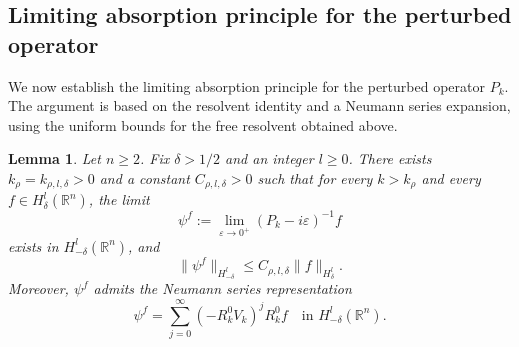 \documentclass[12pt,a4paper]{amsart}
\numberwithin{equation}{section}
\theoremstyle{plain}
\newtheorem{lemma}[theorem]{Lemma}
\theoremstyle{definition}
\begin{document}
\subsection{Limiting absorption principle for the perturbed operator}
We now establish the limiting absorption principle for the perturbed operator $P_k$.
The argument is based on the resolvent identity and a Neumann series expansion, using the uniform bounds for the free resolvent obtained above.
\begin{lemma}\label{lem_LAP}
Let $n \geq 2$. Fix $\delta >1/2$ and an integer $l \geq 0$. There exists $k_\rho = k_{\rho, l, \delta}>0$ and a constant $C_{ \rho,l, \delta}>0$ such that for every $k > k_\rho$ and every $f \in H^l_\delta(\mathbb{R}^n)$, the limit
\begin{equation}\label{eq:LAP_def}
\psi^f := \lim_{\varepsilon \to 0^+}(P_k - i\varepsilon)^{-1}f
\end{equation}
exists in $H^l_{-\delta}(\mathbb{R}^n)$, and %
\begin{equation}\label{eq:weighted_stability}
\|\psi^f\|_{H^l_{-\delta}} \leq C_{ \rho,l, \delta}\|f\|_{H^l_\delta}.
\end{equation}
Moreover, $\psi^f$ admits the Neumann series representation
\begin{equation}\label{eq:psi_equals_Nseries}
\psi^f
=
\sum_{j=0}^\infty
(-R_k^0 V_k)^j R_k^0 f
\quad\text{in } H^l_{-\delta}(\mathbb{R}^n).
\end{equation}

\end{lemma}
\end{document}
